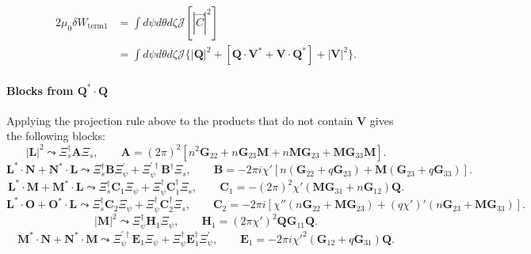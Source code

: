 \documentclass[10pt,a4paper]{article}
\numberwithin{equation}{section}
\begin{document}
\begin{equation}
\begin{aligned}
2\mu_0\delta W_{\mathrm{term1}} & = \int d\psi d\theta d\zeta \mathcal{J} [|\vec{C}|^2]\\
&= \int d\psi d\theta d\zeta \mathcal{J}\{ |\mathbf Q|^2+
\left[\mathbf Q\cdot\mathbf V^* + \mathbf V \cdot \mathbf Q^*
\right]+|\mathbf V|^2\} .
\end{aligned}
\end{equation}

\paragraph{Blocks from \(\mathbf Q^*\cdot\mathbf Q\)}

Applying the projection rule above to the products that do not contain \(\mathbf V\) gives the following blocks:
\begin{equation}
|\mathbf L|^2 \leadsto \Xi_s^\dagger \mathbf A \Xi_s,
\qquad
\mathbf A=(2\pi)^2\left[n^2 \mathbf G_{22}+n \mathbf G_{23}\mathbf M+n \mathbf M \mathbf G_{23}+\mathbf M \mathbf G_{33}\mathbf M\right].
\end{equation}
\begin{equation}
\mathbf L^* \cdot \mathbf N + \mathbf N^* \cdot \mathbf L
\leadsto
\Xi_s^\dagger \mathbf B \Xi_\psi^\prime + \Xi_\psi^{\prime\dagger} \mathbf B^\dagger \Xi_s,
\qquad
\mathbf B=-2\pi i\chi' \left[n(\mathbf G_{22}+q\mathbf G_{23})+\mathbf M(\mathbf G_{23}+q\mathbf G_{33})\right].
\end{equation}
\begin{equation}
\mathbf L^* \cdot \mathbf M + \mathbf M^* \cdot \mathbf L
\leadsto
\Xi_s^\dagger \mathbf C_1 \Xi_\psi + \Xi_\psi^\dagger \mathbf C_1^\dagger \Xi_s,
\qquad
\mathbf C_1=-(2\pi)^2\chi'(\mathbf M \mathbf G_{31}+n\mathbf G_{12})\mathbf Q.
\end{equation}
\begin{equation}
\mathbf L^* \cdot \mathbf O + \mathbf O^* \cdot \mathbf L
\leadsto
\Xi_s^\dagger \mathbf C_2 \Xi_\psi + \Xi_\psi^\dagger \mathbf C_2^\dagger \Xi_s,
\qquad
\mathbf C_2=-2\pi i \left[\chi''(n\mathbf G_{22}+\mathbf M \mathbf G_{23})+(q\chi')'(n\mathbf G_{23}+\mathbf M \mathbf G_{33})\right].
\end{equation}
\begin{equation}
|\mathbf M|^2 \leadsto \Xi_\psi^\dagger \mathbf H_1 \Xi_\psi,
\qquad
\mathbf H_1=(2\pi\chi')^2\mathbf Q\mathbf G_{11}\mathbf Q.
\end{equation}
\begin{equation}
\mathbf M^* \cdot \mathbf N + \mathbf N^* \cdot \mathbf M
\leadsto
\Xi_\psi^{\prime\dagger}\mathbf E_1 \Xi_\psi + \Xi_\psi^\dagger \mathbf E_1^\dagger \Xi_\psi^\prime,
\qquad
\mathbf E_1=-2\pi i\chi'^2(\mathbf G_{12}+q\mathbf G_{31})\mathbf Q.
\end{equation}
\end{document}
